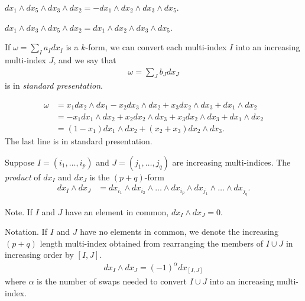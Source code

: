 \documentclass[11pt]{article}
\begin{document}
\begin{example} $dx_1 \wedge dx_5 \wedge dx_3 \wedge dx_2 = - dx_1 \wedge dx_2 \wedge dx_3 \wedge dx_5$.
\end{example}

\begin{example} $dx_1 \wedge dx_3 \wedge dx_5 \wedge dx_2 = dx_1 \wedge dx_2 \wedge dx_3 \wedge dx_5$.
\end{example}

\begin{definition} If $\omega = \sum_I a_I dx_I$ is a $k$-form, we can convert each multi-index $I$ into an increasing multi-index $J$, and we say that \begin{align*} \omega = \sum_J b_J dx_J
\end{align*} is in \emph{standard presentation}.
\end{definition}

\begin{example} \begin{align*} \omega & = x_1 dx_2 \wedge dx_1 - x_2dx_3 \wedge dx_2 + x_3 dx_2 \wedge dx_3 + dx_1 \wedge dx_2 \\ & = -x_1 dx_1 \wedge dx_2 + x_2 dx_2 \wedge dx_3 + x_3 dx_2 \wedge dx_3 + dx_1 \wedge dx_2 \\ & = (1 - x_1) dx_1 \wedge dx_2 + (x_2 + x_3) dx_2 \wedge dx_3.
\end{align*} The last line is in standard presentation.
\end{example}

\begin{definition} Suppose $I = (i_1, \dots, i_p)$ and $J = (j_1, \dots, j_q)$ are increasing multi-indices. The \emph{product} of $dx_I$ and $dx_J$ is the $(p + q)$-form \begin{align*} dx_I \wedge dx_J & = dx_{i_1} \wedge dx_{i_2} \wedge \dots \wedge dx_{i_p} \wedge dx_{j_1} \wedge \dots \wedge dx_{j_q}.
\end{align*}
\end{definition}

Note. If $I$ and $J$ have an element in common, $dx_I \wedge dx_J = 0$.

Notation. If $I$ and $J$ have no elements in common, we denote the increasing $(p + q)$ length multi-index obtained from rearranging the members of $I \cup J$ in increasing order by $[I, J]$. \begin{align*} dx_I \wedge dx_J = (-1)^{\alpha} dx_{[I, J]}
\end{align*} where $\alpha$ is the number of swaps needed to convert $I \cup J$ into an increasing multi-index.
\end{document}

